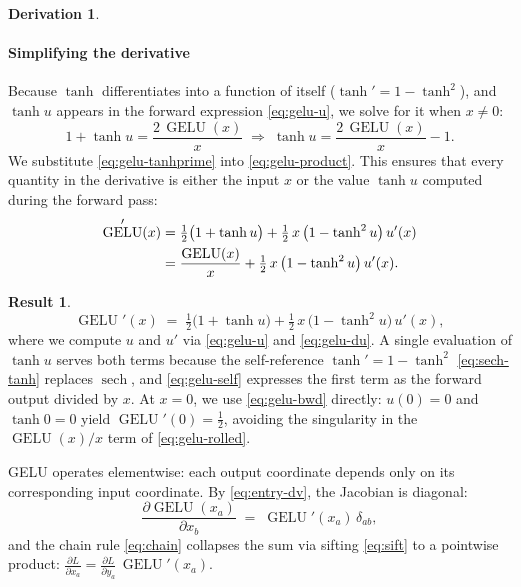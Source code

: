 \documentclass[letterpaper, 10 pt, conference]{ieeeconf}
\newcommand{\pdv}[2]{\frac{\partial #1}{\partial #2}}
\newcommand{\dL}[1]{\pdv{L}{#1}}
\newcommand{\kron}[2]{\delta_{#1 #2}}
\DeclareMathOperator{\gelu}{GELU}
\theoremstyle{definition}
\newtheorem*{derivation}{Derivation}
\newtheorem*{result}{Result}
\begin{document}
\begin{derivation}
  \paragraph{Simplifying the derivative}
  Because $\tanh$ differentiates into a function of itself ($\tanh' = 1 - \tanh^{2}$), and $\tanh u$ appears in the forward expression \eqref{eq:gelu-u}, we solve for it when $x \neq 0$:
  \begin{equation}
    1 + \tanh u = \frac{2\,\gelu(x)}{x}
    \;\Longrightarrow\;
    \tanh u = \frac{2\,\gelu(x)}{x} - 1.
    \label{eq:gelu-self}
  \end{equation}
  We substitute \eqref{eq:gelu-tanhprime} into \eqref{eq:gelu-product}. This ensures that every quantity in the derivative is either the input $x$ or the value $\tanh u$ computed during the forward pass:
  \begin{align}
    \gelu'(x)
     & = \tfrac{1}{2}\bigl(1 + \tanh u\bigr)
    + \tfrac{1}{2}\,x\,\bigl(1 - \tanh^{2} u\bigr)\,u'(x) \notag \\
     & = \frac{\gelu(x)}{x}
    + \tfrac{1}{2}\,x\,\bigl(1 - \tanh^{2} u\bigr)\,u'(x).
    \label{eq:gelu-rolled}
  \end{align}
\end{derivation}

\begin{result}
  \begin{equation}
    \gelu'(x)
    \;=\;
    \tfrac{1}{2}\bigl(1 + \tanh u\bigr)
    + \tfrac{1}{2}\,x\,\bigl(1 - \tanh^{2} u\bigr)\,u'(x),
    \label{eq:gelu-bwd}
  \end{equation}
  where we compute $u$ and $u'$ via \eqref{eq:gelu-u} and \eqref{eq:gelu-du}. A single evaluation of $\tanh u$ serves both terms because the self-reference $\tanh' = 1 - \tanh^{2}$ \eqref{eq:sech-tanh} replaces $\operatorname{sech}$, and \eqref{eq:gelu-self} expresses the first term as the forward output divided by $x$. At $x = 0$, we use \eqref{eq:gelu-bwd} directly: $u(0) = 0$ and $\tanh 0 = 0$ yield $\gelu'(0) = \tfrac{1}{2}$, avoiding the singularity in the $\gelu(x)/x$ term of \eqref{eq:gelu-rolled}.

  GELU operates elementwise: each output coordinate depends only on its corresponding input coordinate. By \eqref{eq:entry-dv}, the Jacobian is diagonal:
  \begin{equation}
    \pdv{\gelu(x_a)}{x_b} \;=\; \gelu'(x_a)\,\kron{a}{b},
    \label{eq:gelu-diag}
  \end{equation}
  and the chain rule \eqref{eq:chain} collapses the sum via sifting \eqref{eq:sift} to a pointwise product: $\dL{x_a} = \dL{y_a}\,\gelu'(x_a)$.
\end{result}
\end{document}
